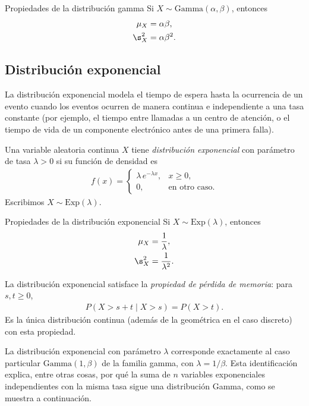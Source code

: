 {Propiedades de la distribución gamma} Si $X \sim \text{Gamma}(\alpha, \beta)$, entonces
\begin{align}
 \mu_X &= \alpha\beta, \\
 \s_X^2 &= \alpha\beta^2.
\end{align}

\subsection{Distribución exponencial}

La distribución exponencial modela el tiempo de espera hasta la ocurrencia de un evento
cuando los eventos ocurren de manera continua e independiente a una tasa constante (por
ejemplo, el tiempo entre llamadas a un centro de atención, o el tiempo de vida de un
componente electrónico antes de una primera falla).

\begin{definicion}
Una variable aleatoria continua $X$ tiene \emph{distribución exponencial} con parámetro
de tasa $\lambda > 0$ si su función de densidad es
\begin{align}
 \label{eq:2.8.8}
 f(x) =
 \begin{cases}
  \lambda\,e^{-\lambda x}, & x \geq 0, \\
  0, & \text{en otro caso.}
 \end{cases}
\end{align}
Escribimos $X \sim \text{Exp}(\lambda)$.
\end{definicion}

{Propiedades de la distribución exponencial} Si $X \sim \text{Exp}(\lambda)$, entonces
\begin{align}
 \mu_X &= \frac{1}{\lambda}, \\
 \s_X^2 &= \frac{1}{\lambda^2}.
\end{align}

\begin{observacion}
La distribución exponencial satisface la \emph{propiedad de pérdida de memoria}:
para $s, t \geq 0$,
\begin{align}
 P(X > s + t \mid X > s) = P(X > t).
\end{align}
Es la única distribución continua (además de la geométrica en el caso discreto)
con esta propiedad.
\end{observacion}

La distribución exponencial con parámetro $\lambda$ corresponde exactamente al caso
particular $\text{Gamma}(1, \beta)$ de la familia gamma, con $\lambda = 1/\beta$. Esta
identificación explica, entre otras cosas, por qué la suma de $n$ variables exponenciales
independientes con la misma tasa sigue una distribución Gamma, como se muestra a
continuación.

